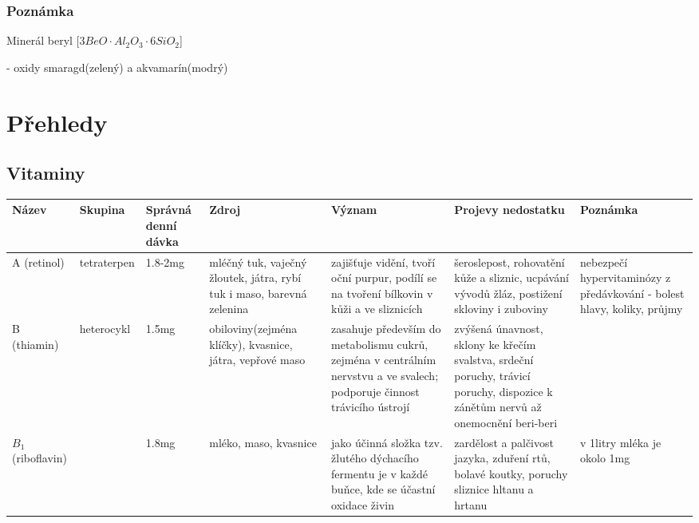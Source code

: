 \documentclass{article}
\begin{document}
    \subsubsection{Poznámka}
    Minerál beryl [$3BeO \cdot Al_2O_3 \cdot 6SiO_2$]

    - oxidy smaragd(zelený) a akvamarín(modrý)

\newpage
\newlength\origheight
\setlength\origheight{\textheight}

\section{Přehledy}
    \begin{landscape}
    \subsection{Vitaminy}
        \begin{longtable}{| m{7em} | m{5em} | m{5em} | m{8em}<{\RaggedRight} | m{15em}<{\RaggedRight} | m{15em}<{\RaggedRight} | m{10em}<{\RaggedRight} |}
            \hline
            Název & Skupina & Správná denní dávka & Zdroj & Význam & Projevy nedostatku & Poznámka \\
            \hline
            A (retinol) & tetraterpen & 1.8-2mg & mléčný tuk, vaječný žloutek, játra, rybí tuk i maso, barevná zelenina & zajišťuje vidění, tvoří oční purpur, podílí se na tvoření bílkovin v kůži a ve sliznicích & šeroslepost, rohovatění kůže a sliznic, ucpávání vývodů žláz, postižení skloviny i zuboviny & nebezpečí hypervitaminózy z předávkování - bolest hlavy, koliky, průjmy \\
            \hline
            B (thiamin)& heterocykl & 1.5mg & obiloviny(zejména klíčky), kvasnice, játra, vepřové maso & zasahuje především do metabolismu cukrů, zejména v centrálním nervstvu a ve svalech; podporuje činnost trávicího ústrojí & zvýšená únavnost, sklony ke křečím svalstva, srdeční poruchy, trávicí poruchy, dispozice k zánětům nervů až onemocnění beri-beri & \\
            \hline
            $B_1$ (riboflavin) & & 1.8mg & mléko, maso, kvasnice & jako účinná složka tzv. žlutého dýchacího fermentu je v každé buňce, kde se účastní oxidace živin & zardělost a palčivost jazyka, zduření rtů, bolavé koutky, poruchy sliznice hltanu a hrtanu & v 1litry mléka je okolo 1mg \\

\end{longtable}
\end{landscape}
\end{document}

